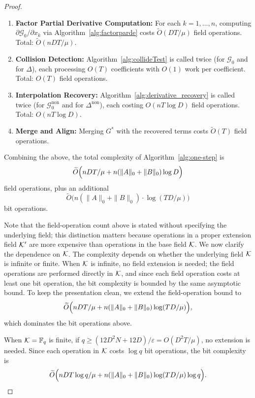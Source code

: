 \documentclass{article}
\numberwithin{equation}{section}
\begin{document}
\begin{proof}
\begin{enumerate}
    
    \item \textbf{Factor Partial Derivative Computation:} For each $k=1,\dots,n$, computing $\partial \mathcal{G}_0/\partial x_k$ via Algorithm~\ref{alg:factorparde} costs $\widetilde{O}(DT/\mu)$ field operations. Total: $\widetilde{O}(n DT/\mu)$.
    
    \item \textbf{Collision Detection:} Algorithm~\ref{alg:collideTest} is called twice (for $\mathcal{G}_0$ and for $\Delta$), each processing $O(T)$ coefficients with $O(1)$ work per coefficient. Total: $O(T)$ field operations.
    
    \item \textbf{Interpolation Recovery:} Algorithm~\ref{alg:derivative_recovery} is called twice (for $\mathcal{G}_0^{\text{non}}$ and for $\Delta^{\text{non}}$), each costing $O(n T \log D)$ field operations. Total: $O(nT \log D)$.
    
    \item \textbf{Merge and Align:} Merging $G^*$ with the recovered terms costs $\widetilde{O}(T)$ field operations.
\end{enumerate}

Combining the above, the total complexity of Algorithm~\ref{alg:one-step} is
\[
\widetilde{O}\Bigl( n D T / \mu + n(\|A\|_0 + \|B\|_0) \log D \Bigr)
\]
field operations, plus an additional
\[
\widetilde{O}\bigl(n(\|A\|_0 + \|B\|_0)\cdot\log (TD/\mu) \bigr)
\]
bit operations. 


Note that the field-operation count above is stated without specifying the underlying field; this distinction matters because operations in a proper extension field ${\mathcal{K}}'$ are more expensive than operations in the base field ${\mathcal{K}}$. We now clarify the dependence on ${\mathcal{K}}$.
The complexity depends on whether the underlying field ${\mathcal{K}}$ is infinite or finite. When ${\mathcal{K}}$ is infinite, no field extension is needed; the field operations are performed directly in ${\mathcal{K}}$, and since each field operation costs at least one bit operation, the bit complexity is bounded by the same asymptotic bound. To keep the presentation clean, we extend the field-operation bound to
\[
\widetilde{O}\Bigl( n D T / \mu + n(\|A\|_0 + \|B\|_0) \log (TD/\mu) \Bigr),
\]
which dominates the bit operations above.

When ${\mathcal{K}} = \mathbb{F}_q$ is finite, if $q \ge (12D^2 N + 12D)/\varepsilon = O(D^2 T/\mu)$, no extension is needed. Since each operation in ${\mathcal{K}}$ costs $\log q$ bit operations, the bit complexity is
\[
\widetilde{O}\Bigl( n D T \log q / \mu + n(\|A\|_0 + \|B\|_0) \log (TD/\mu)\log q \Bigr).
\]


\end{proof}
\end{document}
